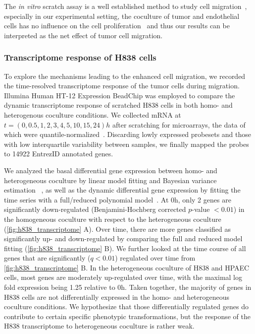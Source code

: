 The \emph{in vitro} scratch assay is a well established method
to study cell migration~\citep{Busch2008,Liang2007}, especially
in our experimental setting, the coculture of tumor and 
endothelial cells has no influence on the cell proliferation~%
\citep{Dauscher2012} and thus our results can be interpreted
as the net effect of tumor cell migration.

\subsubsection{Transcriptome response of H838 cells}
To explore the mechanisms leading to the enhanced cell migration, we recorded the time-resolved transcriptome response of the tumor cells during migration.
Illumina Human HT-12 Expression BeadChip was employed to compare the dynamic transcriptome response of scratched H838 cells in both homo- and heterogenous coculture conditions.
We collected mRNA at $t=(0,0.5,1,2,3,4,5,10,15,24)h$ after scratching for microarrays,
the data of which were quantile-normalized~\citep{Dunning2008a}.  
Discarding lowly expressed probesets and those with low interquartile 
variability between samples, we finally mapped the probes to 14922 EntrezID 
annotated genes. 

We analyzed the basal differential gene expression between homo- and
heterogeneous coculture by linear model fitting and Bayesian variance estimation~%
\citep{Smyth2004}, as well as the dynamic differential gene expression by fitting
the time series with a full/reduced polynomial model~\citep{Mar2009}. At 0h, only 2
genes are significantly down-regulated (Benjamini-Hochberg
corrected $p$-value $<0.01$) in the homogeneous coculture with respect
to the heterogeneous coculture 
(\ref{fig:h838_transcriptome} A). Over time, there are more
genes classified as significantly up- and down-regulated by comparing the full and
reduced model fitting (\ref{fig:h838_transcriptome} B). 
We further looked at the time course of all genes that are
significantly ($q<0.01$) regulated over time from 
\ref{fig:h838_transcriptome} B. In the heterogeneous
coculture of H838 and HPAEC cells, most genes are 
moderately up-regulated over time, with the maximal
log fold expression being 1.25 relative to 0h.
Taken together, the majority of genes
in H838 cells are not differentially expressed in the homo- and heterogeneous
coculture conditions. We hypothesize that those 
differentially regulated genes do contribute to certain specific
phenotypic transformations, but the response of the H838
transcriptome to heterogeneous coculture is rather weak.

